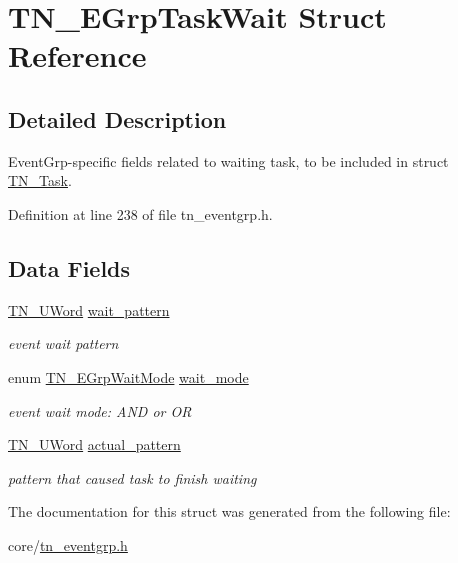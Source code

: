 \hypertarget{structTN__EGrpTaskWait}{}\section{T\+N\+\_\+\+E\+Grp\+Task\+Wait Struct Reference}
\label{structTN__EGrpTaskWait}


\subsection{Detailed Description}
Event\+Grp-\/specific fields related to waiting task, to be included in struct \hyperlink{structTN__Task}{T\+N\+\_\+\+Task}. 

Definition at line 238 of file tn\+\_\+eventgrp.\+h.

\subsection*{Data Fields}
\begin{DoxyCompactItemize}
\item 
\mbox{\label{structTN__EGrpTaskWait_a9e35b117bbf6c8ed435bf08b7ca875b3}} 
\hyperlink{tn__arch__example_8h_ab80cba0fe9ffcd9011d53dfeb9e39bf4}{T\+N\+\_\+\+U\+Word} \hyperlink{structTN__EGrpTaskWait_a9e35b117bbf6c8ed435bf08b7ca875b3}{wait\+\_\+pattern}
\begin{DoxyCompactList}\small\item\em event wait pattern \end{DoxyCompactList}\item 
\mbox{\label{structTN__EGrpTaskWait_a0f62cf02ae71ab6a79b01f28f48854f8}} 
enum \hyperlink{tn__eventgrp_8h_a9d42ee61ae8da342f1cd6440b7e54bbd}{T\+N\+\_\+\+E\+Grp\+Wait\+Mode} \hyperlink{structTN__EGrpTaskWait_a0f62cf02ae71ab6a79b01f28f48854f8}{wait\+\_\+mode}
\begin{DoxyCompactList}\small\item\em event wait mode\+: {\ttfamily A\+ND} or {\ttfamily OR} \end{DoxyCompactList}\item 
\mbox{\label{structTN__EGrpTaskWait_ab0dd157cd06693b45a73a4b82ad713e8}} 
\hyperlink{tn__arch__example_8h_ab80cba0fe9ffcd9011d53dfeb9e39bf4}{T\+N\+\_\+\+U\+Word} \hyperlink{structTN__EGrpTaskWait_ab0dd157cd06693b45a73a4b82ad713e8}{actual\+\_\+pattern}
\begin{DoxyCompactList}\small\item\em pattern that caused task to finish waiting \end{DoxyCompactList}\end{DoxyCompactItemize}


The documentation for this struct was generated from the following file\+:\begin{DoxyCompactItemize}
\item 
core/\hyperlink{tn__eventgrp_8h}{tn\+\_\+eventgrp.\+h}\end{DoxyCompactItemize}
